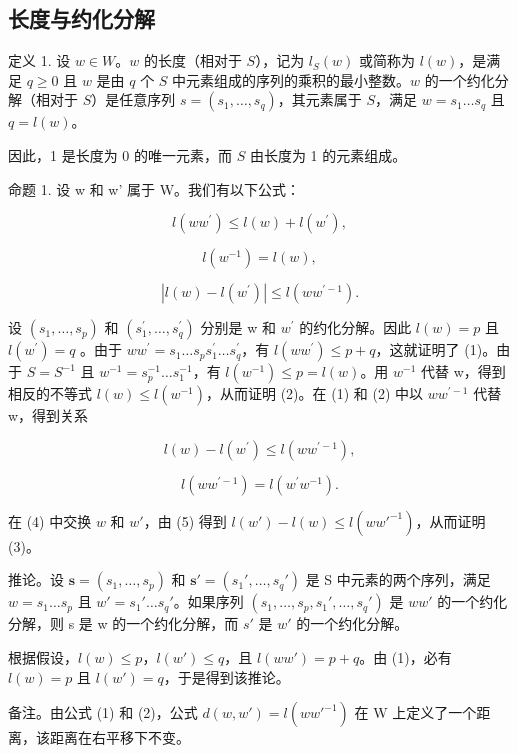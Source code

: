 \subsection{长度与约化分解}

定义 1. 设 \(w \in W\)。\(w\) 的长度（相对于 \(S\)），记为 \(l_{S}(w)\) 或简称为 \(l(w)\)，是满足 \(q \geqslant 0\) 且 \(w\) 是由 \(q\) 个 \(S\) 中元素组成的序列的乘积的最小整数。\(w\) 的一个约化分解（相对于 \(S\)）是任意序列 \(s = (s_1, \ldots, s_q)\)，其元素属于 \(S\)，满足 \(w = s_1 \ldots s_q\) 且 \(q = l(w)\)。

因此，1 是长度为 0 的唯一元素，而 \(S\) 由长度为 1 的元素组成。

命题 1. 设 w 和 w' 属于 W。我们有以下公式：

\[
l (w w ^ {\prime}) \leqslant l (w) + l (w ^ {\prime}),\tag{1}
\]

\[
l (w ^ {- 1}) = l (w),\tag{2}
\]

\[
\left| l (w) - l \left(w ^ {\prime}\right) \right| \leqslant l \left(w w ^ {\prime - 1}\right).\tag{3}
\]

设 \((s_{1},\ldots,s_{p})\) 和 \((s_{1}^{\prime},\ldots,s_{q}^{\prime})\) 分别是 w 和 \(w^{\prime}\) 的约化分解。因此 \(l(w)=p\) 且 \(l(w^{\prime})=q\) 。由于 \(ww^{\prime}=s_{1}\ldots s_{p}s_{1}^{\prime}\ldots s_{q}^{\prime}\)，有 \(l(ww^{\prime})\leqslant p+q\)，这就证明了 (1)。由于 \(S=S^{-1}\) 且 \(w^{-1}=s_{p}^{-1}\ldots s_{1}^{-1}\)，有 \(l(w^{-1})\leqslant p=l(w)\)。用 \(w^{-1}\) 代替 w，得到相反的不等式 \(l(w)\leqslant l(w^{-1})\)，从而证明 (2)。在 (1) 和 (2) 中以 \(ww^{\prime-1}\) 代替 w，得到关系

\[
l (w) - l \left(w ^ {\prime}\right) \leqslant l \left(w w ^ {\prime - 1}\right),\tag{4}
\]

\[
l \left(w w ^ {\prime - 1}\right) = l \left(w ^ {\prime} w ^ {- 1}\right).\tag{5}
\]

在 (4) 中交换 \(w\) 和 \(w'\)，由 (5) 得到 \(l(w') - l(w) \leqslant l(ww'^{-1})\)，从而证明 (3)。

推论。设 \(\mathbf{s} = (s_{1}, \ldots, s_{p})\) 和 \(\mathbf{s}' = (s_{1}', \ldots, s_{q}')\) 是 S 中元素的两个序列，满足 \(w = s_{1} \ldots s_{p}\) 且 \(w' = s_{1}' \ldots s_{q}'\)。如果序列 \((s_{1}, \ldots, s_{p}, s_{1}', \ldots, s_{q}')\) 是 \(ww'\) 的一个约化分解，则 s 是 w 的一个约化分解，而 \(s'\) 是 \(w'\) 的一个约化分解。

根据假设，\(l(w) \leqslant p\)，\(l(w') \leqslant q\)，且 \(l(ww') = p + q\)。由 (1)，必有 \(l(w) = p\) 且 \(l(w') = q\)，于是得到该推论。

备注。由公式 (1) 和 (2)，公式 \(d(w, w') = l(ww'^{-1})\) 在 W 上定义了一个距离，该距离在右平移下不变。

